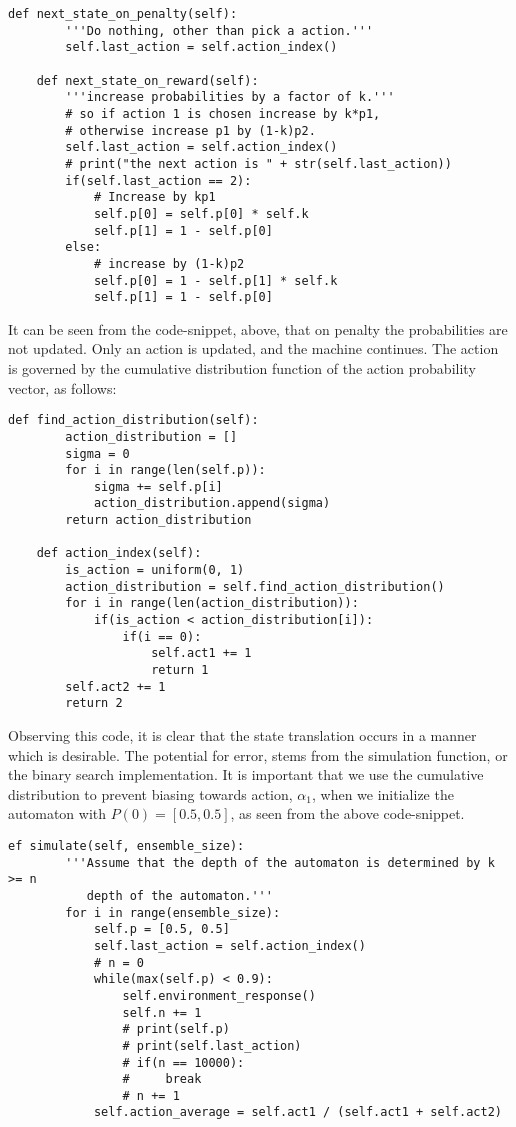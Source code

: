 \documentclass[10pt,english]{article}
\begin{document}
\begin{lstlisting}[label={list:first},caption=State Translation in the $L_{R-I}$  automaton.] 
 def next_state_on_penalty(self):
        '''Do nothing, other than pick a action.'''
        self.last_action = self.action_index()

    def next_state_on_reward(self):
        '''increase probabilities by a factor of k.'''
        # so if action 1 is chosen increase by k*p1,
        # otherwise increase p1 by (1-k)p2.
        self.last_action = self.action_index()
        # print("the next action is " + str(self.last_action))
        if(self.last_action == 2):
            # Increase by kp1
            self.p[0] = self.p[0] * self.k
            self.p[1] = 1 - self.p[0]
        else:
            # increase by (1-k)p2
            self.p[0] = 1 - self.p[1] * self.k
            self.p[1] = 1 - self.p[0]   
\end{lstlisting}
    It can be seen from the code-snippet, above, that on penalty the probabilities are not updated.  Only an action is updated, and the machine continues.  The action is governed by the cumulative distribution function of the action probability vector, as follows:
\begin{lstlisting}[label={list:first},caption=Action selection in the $L_{R-I}$  automaton.]
def find_action_distribution(self):
        action_distribution = []
        sigma = 0
        for i in range(len(self.p)):
            sigma += self.p[i]
            action_distribution.append(sigma)
        return action_distribution

    def action_index(self):
        is_action = uniform(0, 1)
        action_distribution = self.find_action_distribution()
        for i in range(len(action_distribution)):
            if(is_action < action_distribution[i]):
                if(i == 0):
                    self.act1 += 1
                    return 1
        self.act2 += 1
        return 2
\end{lstlisting}
Observing this code, it is clear that the state translation occurs in a manner which is desirable.  The potential for error, stems from the simulation function, or the binary search implementation. It is important that we use the cumulative distribution to prevent biasing towards action, $\alpha_1$, when we initialize the automaton with $P(0) = [0.5, 0.5]$, as seen from the above code-snippet.
\begin{lstlisting}[label={list:first},caption=Simulating the $L_{R-I}$  automaton.]
ef simulate(self, ensemble_size):
        '''Assume that the depth of the automaton is determined by k >= n
           depth of the automaton.'''
        for i in range(ensemble_size):
            self.p = [0.5, 0.5]
            self.last_action = self.action_index()
            # n = 0
            while(max(self.p) < 0.9):
                self.environment_response()
                self.n += 1
                # print(self.p)
                # print(self.last_action)
                # if(n == 10000):
                #     break
                # n += 1
            self.action_average = self.act1 / (self.act1 + self.act2)
\end{lstlisting}
\end{document}
